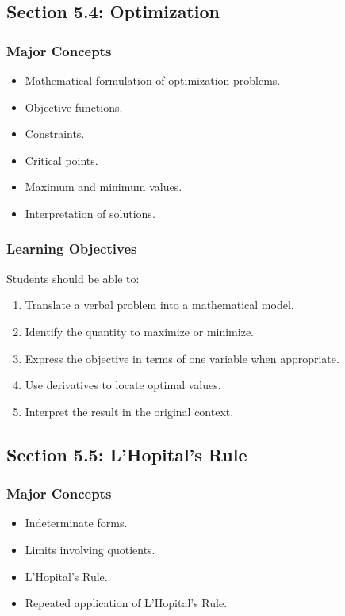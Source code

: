 \documentclass[11pt]{article}
\begin{document}
\subsection{Section 5.4: Optimization}

\subsubsection{Major Concepts}

\begin{itemize}
    \item Mathematical formulation of optimization problems.
    \item Objective functions.
    \item Constraints.
    \item Critical points.
    \item Maximum and minimum values.
    \item Interpretation of solutions.
\end{itemize}

\subsubsection{Learning Objectives}

Students should be able to:

\begin{enumerate}
    \item Translate a verbal problem into a mathematical model.
    \item Identify the quantity to maximize or minimize.
    \item Express the objective in terms of one variable when appropriate.
    \item Use derivatives to locate optimal values.
    \item Interpret the result in the original context.
\end{enumerate}

\subsection{Section 5.5: L'Hopital's Rule}

\subsubsection{Major Concepts}

\begin{itemize}
    \item Indeterminate forms.
    \item Limits involving quotients.
    \item L'Hopital's Rule.
    \item Repeated application of L'Hopital's Rule.
\end{itemize}
\end{document}
